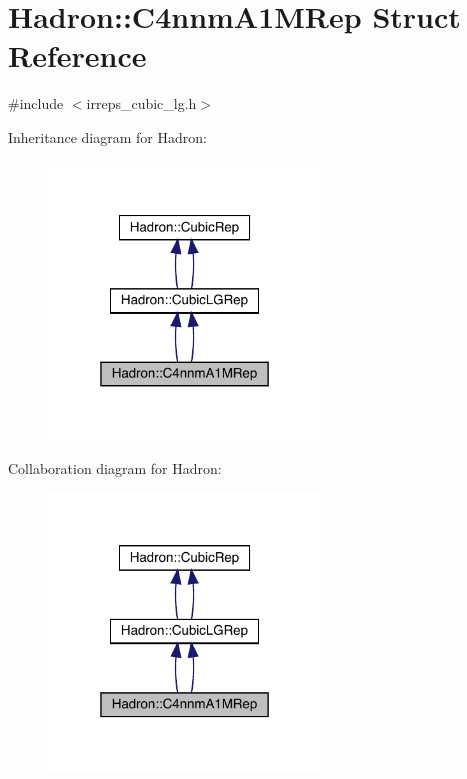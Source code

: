\hypertarget{structHadron_1_1C4nnmA1MRep}{}\section{Hadron\+:\+:C4nnm\+A1\+M\+Rep Struct Reference}
\label{structHadron_1_1C4nnmA1MRep}


{\ttfamily \#include $<$irreps\+\_\+cubic\+\_\+lg.\+h$>$}



Inheritance diagram for Hadron\+:\nopagebreak
\begin{figure}[H]
\begin{center}
\leavevmode
\includegraphics[width=205pt]{df/d6e/structHadron_1_1C4nnmA1MRep__inherit__graph}
\end{center}
\end{figure}


Collaboration diagram for Hadron\+:\nopagebreak
\begin{figure}[H]
\begin{center}
\leavevmode
\includegraphics[width=205pt]{dc/df5/structHadron_1_1C4nnmA1MRep__coll__graph}
\end{center}
\end{figure}
